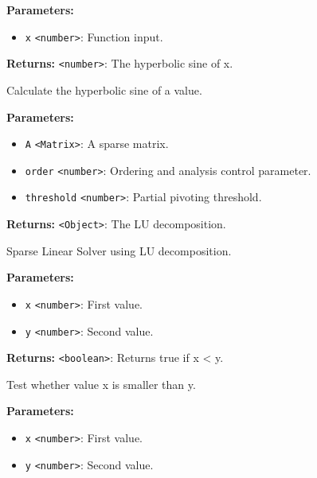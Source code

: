 \documentclass[12pt,a4paper]{article}
\begin{document}
\noindent \textbf{Parameters:}
\begin{itemize}
  \item \texttt{x} \texttt{<number>}: Function input.
\end{itemize}

\noindent \textbf{Returns:} \texttt{<number>}: The hyperbolic sine of x.

\noindent Calculate the hyperbolic sine of a value.

\vspace{5mm}
\noindent {}


\noindent \textbf{Parameters:}
\begin{itemize}
  \item \texttt{A} \texttt{<Matrix>}: A sparse matrix.
  \item \texttt{order} \texttt{<number>}: Ordering and analysis control parameter.
  \item \texttt{threshold} \texttt{<number>}: Partial pivoting threshold.
\end{itemize}

\noindent \textbf{Returns:} \texttt{<Object>}: The LU decomposition.

\noindent Sparse Linear Solver using LU decomposition.

\vspace{5mm}
\noindent {}


\noindent \textbf{Parameters:}
\begin{itemize}
  \item \texttt{x} \texttt{<number>}: First value.
  \item \texttt{y} \texttt{<number>}: Second value.
\end{itemize}

\noindent \textbf{Returns:} \texttt{<boolean>}: Returns true if x < y.

\noindent Test whether value x is smaller than y.

\vspace{5mm}
\noindent {}


\noindent \textbf{Parameters:}
\begin{itemize}
  \item \texttt{x} \texttt{<number>}: First value.
  \item \texttt{y} \texttt{<number>}: Second value.
\end{itemize}
\end{document}
